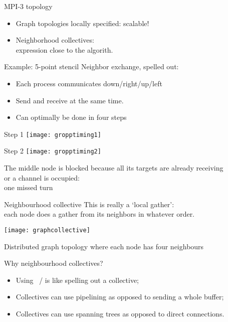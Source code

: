 \begin{frame}[containsverbatim]{MPI-3 topology}
  \begin{itemize}
  \item Graph topologies locally specified: scalable!
  \item Neighborhood collectives:\\
    expression close to the algorith.
  \end{itemize}
\end{frame}

\begin{frame}[containsverbatim]{Example: 5-point stencil}
  Neighbor exchange,
  spelled out:
  \begin{itemize}
  \item Each process communicates down/right/up/left
  \item Send and receive at the same time.
  \item Can optimally be done in four steps
  \end{itemize}
\end{frame}

\begin{frame}[containsverbatim]{Step 1}
  \texttt{[image: gropptiming1]}
\end{frame}

\begin{frame}[containsverbatim]{Step 2}
  \texttt{[image: gropptiming2]}

  The middle node is blocked because all its targets
  are already receiving\\
  or a channel is occupied:\\
  one missed turn
\end{frame}

\begin{frame}{Neighbourhood collective}
  \label{fig:graphcollective}
  This is really a `local gather':\\
  each node does a gather from its neighbors in whatever order.\\

  \texttt{[image: graphcollective]}

  Distributed graph topology where each
  node has four neighbours
\end{frame}

\begin{frame}[containsverbatim]{Why neighbourhood collectives?}
  \begin{itemize}
  \item Using ~/  is like spelling out a collective;
  \item Collectives can use pipelining as opposed to sending  a whole
    buffer;
  \item Collectives can use spanning trees as opposed to direct connections.
  \end{itemize}
\end{frame}

